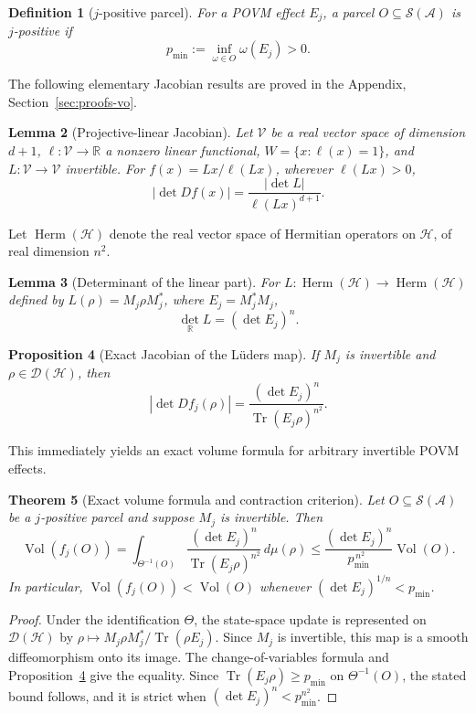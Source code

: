 \documentclass[11pt]{article}
\newtheorem{theorem}{Theorem}[section]
\newtheorem{definition}[theorem]{Definition}
\newtheorem{lemma}[theorem]{Lemma}
\newtheorem{proposition}[theorem]{Proposition}
\begin{document}
\begin{definition}[$j$-positive parcel]
\label{def:jpositive}
For a POVM effect $E_j$, a parcel $O\subseteq\mathcal S(\mathcal A)$ is
\emph{$j$-positive} if
\[
p_{\min}:=\inf_{\omega\in O}\omega(E_j)>0.
\]
\end{definition}

The following elementary Jacobian results are proved in the Appendix,
Section~\ref{sec:proofs-vo}.

\begin{lemma}[Projective-linear Jacobian]
\label{lem:proj}
Let $\mathcal V$ be a real vector space of dimension $d+1$,
$\ell:\mathcal V\to\mathbb R$ a nonzero linear functional,
$W=\{x:\ell(x)=1\}$, and $L:\mathcal V\to\mathcal V$ invertible. For
$f(x)=Lx/\ell(Lx)$, wherever $\ell(Lx)>0$,
\[
|\det Df(x)|
=
\frac{|\det L|}{\ell(Lx)^{d+1}}.
\]
\end{lemma}

Let $\operatorname{Herm}(\mathcal H)$ denote the real vector space of
Hermitian operators on $\mathcal H$, of real dimension $n^2$.

\begin{lemma}[Determinant of the linear part]
\label{lem:detL}
For $L:\operatorname{Herm}(\mathcal H)\to
\operatorname{Herm}(\mathcal H)$ defined by $L(\rho)=M_j\rho M_j^*$,
where $E_j=M_j^*M_j$,
\[
\det_{\mathbb R}L=(\det E_j)^n.
\]
\end{lemma}

\begin{proposition}[Exact Jacobian of the L\"uders map]
\label{prop:jacobian}
If $M_j$ is invertible and $\rho\in\mathcal D(\mathcal H)$, then
\[
\left|\det Df_j(\rho)\right|
=
\frac{(\det E_j)^n}
     {\operatorname{Tr}(E_j\rho)^{n^2}}.
\]
\end{proposition}

This immediately yields an exact volume formula for arbitrary invertible
POVM effects.

\begin{theorem}[Exact volume formula and contraction criterion]
\label{thm:exactvolume}
Let $O\subseteq\mathcal S(\mathcal A)$ be a $j$-positive parcel and
suppose $M_j$ is invertible. Then
\[
\operatorname{Vol}(f_j(O))
=
\int_{\Theta^{-1}(O)}
\frac{(\det E_j)^n}
     {\operatorname{Tr}(E_j\rho)^{n^2}}
\,d\mu(\rho)
\leq
\frac{(\det E_j)^n}{p_{\min}^{\,n^2}}
\operatorname{Vol}(O).
\]
In particular,
$\operatorname{Vol}(f_j(O))<\operatorname{Vol}(O)$ whenever
$(\det E_j)^{1/n}<p_{\min}$.
\end{theorem}
\begin{proof}
Under the identification $\Theta$, the state-space update is represented
on $\mathcal D(\mathcal H)$ by
$\rho\mapsto M_j\rho M_j^*/\operatorname{Tr}(\rho E_j)$.
Since $M_j$ is invertible, this map is a smooth diffeomorphism onto its
image. The change-of-variables formula and
Proposition~\ref{prop:jacobian} give the equality. Since
$\operatorname{Tr}(E_j\rho)\geq p_{\min}$ on $\Theta^{-1}(O)$, the
stated bound follows, and it is strict when
$(\det E_j)^n<p_{\min}^{n^2}$.
\end{proof}
\end{document}
